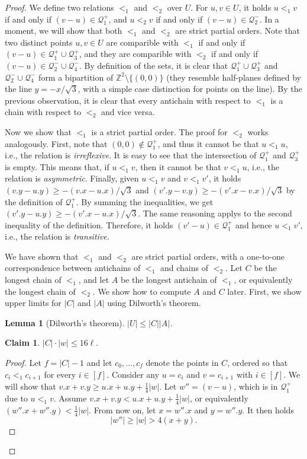 \documentclass[11pt, letterpaper]{article}
\theoremstyle{plain}
\newtheorem{lemma}{Lemma}
\theoremstyle{definition}
\newtheorem{claim}{Claim}
\theoremstyle{remark}
\newcommand{\Q}{\mathcal{Q}}
\newcommand{\absolute}[1]{\lvert#1\rvert}
\begin{document}
\begin{proof}
We define two relations $<_1$ and $<_2$ over $U$. For $u, v \in U$, it holds $u <_1 v$ if and only if $(v - u) \in \Q_1^+$, and $u <_2 v$ if and only if $(v - u) \in \Q_2^-$. In a moment, we will show that both $<_1$ and $<_2$ are strict partial orders. 
Note that two distinct points $u,v \in U$ are comparible with $<_1$ if and only if $(v - u) \in \Q_1^+ \cup \Q_3^+$, and they are comparible with $<_2$ if and only if $(v - u) \in \Q_2^- \cup \Q_4^-$. 
By definition of the sets, it is clear that $\Q_1^+ \cup \Q_3^+$ and $\Q_2^- \cup \Q_4^-$ form a bipartition of $\mathbb Z^2 \setminus \{(0,0)\}$ (they resemble half-planes defined by the line $y = -x / \sqrt{3}$, with a simple case distinction for points on the line). By the previous observation, it is clear that every antichain with respect to $<_1$ is a chain with respect to $<_2$ and vice versa.

Now we show that $<_1$ is a strict partial order. The proof for $<_2$ works analogously. First, note that $(0,0) \notin \Q_1^+$, and thus it cannot be that $u <_1 u$, i.e., the relation is \emph{irreflexive}. It is easy to see that the intersection of $\Q_1^+$ and $\Q_3^+$ is empty. This means that, if $u <_1 v$, then it cannot be that $v <_1 u$, i.e., the relation is \emph{asymmetric}. Finally, given $u <_1 v$ and $v <_1 v'$, it holds $(v.y - u.y) \geq -(v.x-u.x)/\sqrt{3}$ and $(v'.y - v.y) \geq -(v'.x-v.x)/\sqrt{3}$ by the definition of $\Q_1^+$. By summing the inequalities, we get $(v'.y - u.y) \geq -(v'.x-u.x)/\sqrt{3}$. The same reasoning applys to the second inequality of the definition. Therefore, it holds $(v' - u) \in \Q_1^+$ and hence $u <_1 v'$, i.e., the relation is \emph{transitive}.

We have shown that $<_1$ and $<_2$ are strict partial orders, with a one-to-one correspondence between antichains of $<_1$ and chains of $<_2$.
Let $C$ be the longest chain of $<_1$, and let $A$ be the longest antichain of $<_1$, or equivalently the longest chain of $<_2$. We show how to compute $A$ and $C$ later. First, we show upper limits for $\absolute{C}$ and $\absolute{A}$ using Dilworth's theorem.

\begin{lemma}[Dilworth's theorem]\label{dilworth}
	$|U| \le |C| |A|$.
\end{lemma}

\begin{claim}\label{C_ineq}
	$\absolute{C} \cdot \absolute{w} \leq 16\ell$. 
	\begin{proof}
		Let $f = |C| - 1$ and
		let $c_0, \dots, c_{f}$ denote the points in $C$, ordered so that $c_i <_1 c_{i + 1}$ for every $i \in [f]$.
		Consider any $u = c_i$ and $v = c_{i + 1}$ with $i \in [f]$. We will show that $v.x + v.y \geq u.x + u.y + \frac14\absolute{w}$. 		
		Let $w'' = (v - u)$, which is in $\Q_1^+$ due to $u <_1 v$. Assume $v.x + v.y < u.x + u.y + \frac14\absolute{w}$, or equivalently $(w''.x + w''.y) < \frac14\absolute{w}$. From now on, let $x = w''.x$ and $y = w''.y$. It then holds $$\absolute{w''} \geq \absolute{w} > 4(x + y).$$
		

\end{proof}
\end{claim}
\end{proof}
\end{document}

